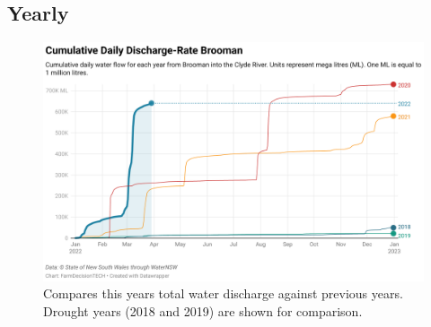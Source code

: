 \documentclass[10pt]{article}
\begin{document}
\subsection{Yearly}
\begin{figure}[H]
\centering
\includegraphics[width=\textwidth]{combined-dischargerate.png}
\caption[Yearly Cumulative Discharge Rate Brooman]{Compares this years total water discharge against previous years. Drought years (2018 and 2019) are shown for comparison.}
\end{figure}
\end{document}
